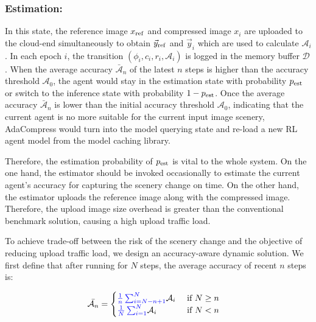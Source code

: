 \subsubsection{Estimation:}

In this state, the reference image $ x_{\rm ref} $ and compressed image $ x_i $ are uploaded to the cloud-end simultaneously to obtain $ \vec{y}_{\rm ref} $ and $ \vec{y}_i $ which are used to calculate $ \mathcal{A}_i $. In each epoch $ i $, the transition $ (\phi_i, c_i, r_i, \mathcal{A}_i) $ is logged in the memory buffer $ \mathcal{D} $. When the average accuracy $ \bar{\mathcal{A}}_n $ of the latest $ n $ steps is higher than the accuracy threshold $ \mathcal{A}_0 $, the agent would stay in the estimation state with probability $ p_{\rm est} $ or switch to the inference state with probability $ 1 - p_{\rm est} $. Once the average accuracy $ \bar{\mathcal{A}}_n $ is lower than the initial accuracy threshold $ \mathcal{A}_0 $, indicating that the current agent is no more suitable for the current input image scenery, AdaCompress would turn into the model querying state and re-load a new RL agent model from the model caching library. %

Therefore, the estimation probability of $ p_{\rm est} $ is vital to the whole system. On the one hand, the estimator should be invoked occasionally to estimate the current agent's accuracy for capturing the scenery change on time. On the other hand, the estimator uploads the reference image along with the compressed image. Therefore, the upload image size overhead is greater than the conventional benchmark solution, causing a high upload traffic load. %

To achieve trade-off between the risk of the scenery change and the objective of reducing upload traffic load, we design an accuracy-aware dynamic solution. We first define that after running for $ N $ steps, the average accuracy of recent $ n $ steps is: 

\begin{align*}
\bar{\mathcal{A}_n} &=
\begin{cases}
{\color{revise}\frac{1}{n}\sum_{i=N-n+1}^{N} } \mathcal{A}_i & \text{ if } N \geq n \\ 
{\color{revise}\frac{1}{N}\sum_{i=1}^{N} }\mathcal{A}_i & \text{ if } N < n 
\end{cases}
\end{align*}

